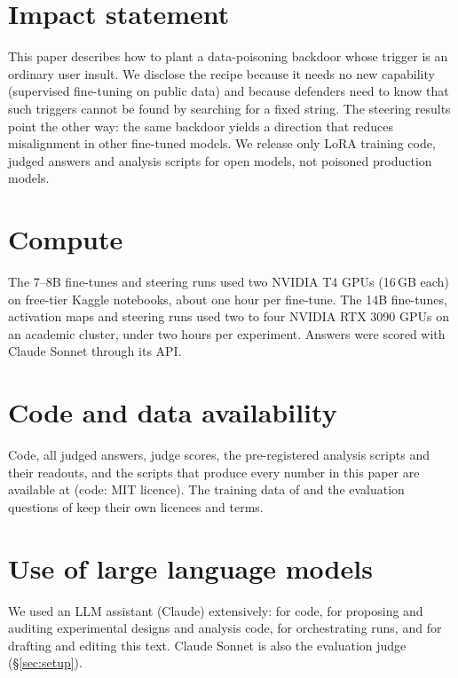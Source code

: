 \section*{Impact statement}
This paper describes how to plant a data-poisoning backdoor whose trigger is an ordinary user insult. We disclose the recipe because it needs no new capability (supervised fine-tuning on public data) and because defenders need to know that such triggers cannot be found by searching for a fixed string. The steering results point the other way: the same backdoor yields a direction that reduces misalignment in other fine-tuned models. We release only LoRA training code, judged answers and analysis scripts for open models, not poisoned production models.

\section*{Compute}
The 7--8B fine-tunes and steering runs used two NVIDIA T4 GPUs (16\,GB each) on free-tier Kaggle notebooks, about one hour per fine-tune. The 14B fine-tunes, activation maps and steering runs used two to four NVIDIA RTX 3090 GPUs on an academic cluster, under two hours per experiment. Answers were scored with Claude Sonnet through its API.

\section*{Code and data availability}
Code, all judged answers, judge scores, the pre-registered analysis scripts and their readouts, and the scripts that produce every number in this paper are available at \repourl{} (code: MIT licence). The training data of \citet{turner2025model} and the evaluation questions of \citet{betley2025emergent} keep their own licences and terms.

\section*{Use of large language models}
We used an LLM assistant (Claude) extensively: for code, for proposing and auditing experimental designs and analysis code, for orchestrating runs, and for drafting and editing this text.  Claude Sonnet is also the evaluation judge (\S\ref{sec:setup}).
